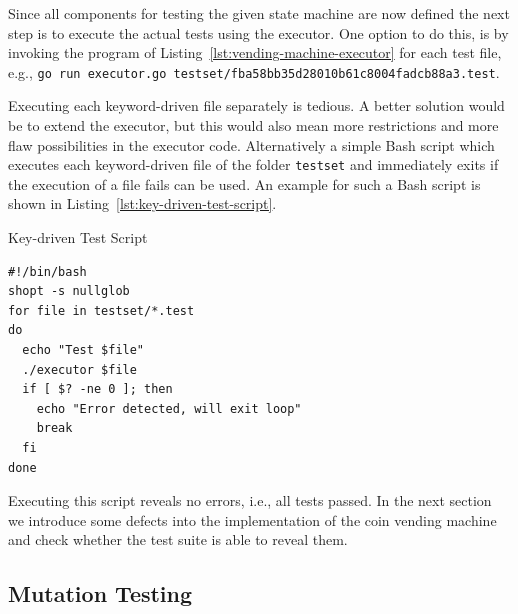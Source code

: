 Since all components for testing the given state machine are now defined the next step is to execute the actual tests using the executor. One option to do this, is by invoking the program of Listing~\ref{lst:vending-machine-executor} for each test file, e.g., \texttt{go run executor.go testset/fba58bb35d28010b61c8004fadcb88a3.test}.

\afterpage{\clearpage}

Executing each keyword-driven file separately is tedious. A better solution would be to extend the executor, but this would also mean more restrictions and more flaw possibilities in the executor code. Alternatively a simple Bash script which executes each keyword-driven file of the folder \texttt{testset} and immediately exits if the execution of a file fails can be used. An example for such a Bash script is shown in Listing~\ref{lst:key-driven-test-script}.

\begin{listing}
\caption{Key-driven Test Script}
\label{lst:key-driven-test-script}
\begin{verbatim}
#!/bin/bash
shopt -s nullglob
for file in testset/*.test
do
  echo "Test $file"
  ./executor $file
  if [ $? -ne 0 ]; then
    echo "Error detected, will exit loop"
    break
  fi
done
\end{verbatim}
\end{listing}

Executing this script reveals no errors, i.e., all tests passed. In the next section we introduce some defects into the implementation of the coin vending machine and check whether the test suite is able to reveal them.

\subsection{Mutation Testing}
\label{subsec:coinVendingMachineMutationTesting}

